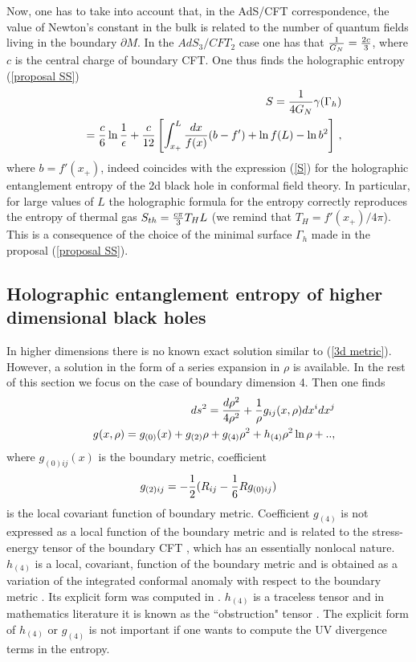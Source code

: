 \documentclass[12pt]{article}
\def\r{\rho}
\def\be{\begin{eqnarray}}
\def\ee{\end{eqnarray}}
\def\lb{\label}
\def\o{\over}
\begin{document}
Now, one has to take  into account that, in the AdS/CFT correspondence, the value of  Newton's constant in the bulk is related to the number of quantum fields
living in the boundary $\partial M$. In the $AdS_3/CFT_2$ case one has that
${1\over G_N}={2c\over 3}$, where $c$ is the central charge of
boundary CFT.  One thus  finds  the holographic entropy (\ref{proposal SS}) 
\be
&&S={1\over 4G_N}\gamma(\Gamma_h)  \\
&&={c\over 6}\ln{1\over \epsilon}+ {c\over 12}\left[
\int_{x_+}^L{dx\over f(x)}(b-f')+\ln f(L)-\ln b^2\right]\, ,\nonumber
\lb{Sgeom} \ee
where $b=f'(x_+)$,  indeed coincides with the expression (\ref{S})  for
the holographic entanglement entropy of the 2d black hole in conformal field
theory.  In particular, for large values of $L$ the holographic formula for the entropy correctly reproduces
the entropy of thermal gas $S_{th}={c\pi\o 3}T_HL$ (we remind that $T_H=f'(x_+)/4\pi$). This is a consequence of the choice of the minimal surface $\Gamma_h$ made  in the proposal (\ref{proposal SS}). 



\subsection{ Holographic entanglement entropy of higher dimensional black holes} 

In higher dimensions there is no known
exact solution similar to (\ref{3d metric}). However, a solution in
the form of  a series expansion in $\rho$  is available.  In
the rest of this section we focus on the case of boundary dimension 4.
Then one finds \cite{Henningson:1998gx} 
\be
&&ds^2={d\r^2\over 4\r^2}+{1\over \r}g_{ij}(x,\rho)dx^idx^j \lb{exp1} \\
&&g_{}(x,\rho)=g_{(0)}(x)+g_{(2)}\rho+g_{(4)}\r^2+h_{(4)}\r^2\ln\r
+..,\nonumber 
\ee 
where $g_{(0)ij}(x)$ is the boundary metric,
coefficient \cite{Henningson:1998gx}
\be
g_{(2)ij}=-{1\over 2}(R_{ij}-{1\over 6}Rg_{(0)ij})
\lb{g2 coefficient}
\ee
is the local covariant function of boundary metric. Coefficient $g_{(4)}$ is not expressed
as a local function of the boundary metric and is related to the
stress-energy tensor of the boundary CFT \cite{deHaro:2000xn},
which has an essentially nonlocal nature. $h_{(4)}$ is a local,
covariant, function of the boundary metric and is obtained as a
variation of the integrated conformal anomaly with respect to the
boundary metric \cite{deHaro:2000xn}. Its explicit form  was computed
in \cite{deHaro:2000xn}. 
$h_{(4)}$ is a traceless tensor and in mathematics literature  it is
known as the ``obstruction" tensor \cite{GH}. The explicit form of $h_{(4)}$ or 
$g_{(4)}$ is not important if one wants to compute the UV divergence terms in the entropy.
\end{document}
